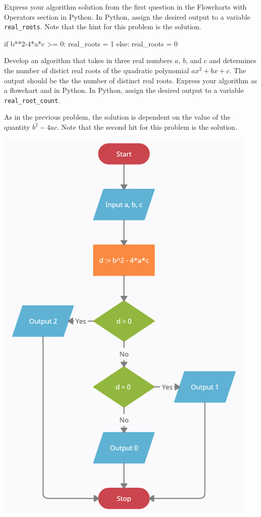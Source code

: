 \documentclass{ximera}
\begin{document}
\begin{question}
	Express your algorithm solution from the first question in the Flowcharts with Operators section in Python. In Python, assign the desired output to a variable \verb|real_roots|.  Note that the hint for this problem is the solution. 
	\begin{hint}
\begin{sageCell}
if b**2-4*a*c >= 0:
	real_roots = 1
else:
	real_roots = 0
\end{sageCell}
	\end{hint}
\end{question}

\begin{question}
	Develop an algorithm that takes in three real numbers $a$, $b$, and $c$ and determines the number of distict real roots of the quadratic polynomial $ax^2+bx+c$. The output should be the the number of distinct real roots. Express your algorithm as a flowchart and in Python. In Python, assign the desired output to a variable \verb|real_root_count|.
	\begin{hint}
	As in the previous problem, the solution is dependent on the value of the quantity $b^2-4ac$. Note that the second hit for this problem is the solution.
	\end{hint}
	\begin{hint}
		\begin{center}
			\includegraphics{realrootscount.png}

\end{center}
\end{hint}
\end{question}
\end{document}
